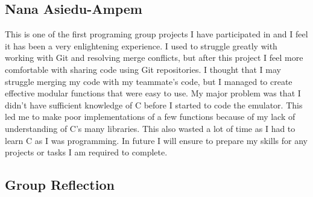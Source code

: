 \documentclass[11pt]{article}
\begin{document}
\subsection{Nana Asiedu-Ampem}
This is one of the first programing group projects I have participated in and I feel it has been a very enlightening experience. I used to struggle greatly with working with Git and resolving merge conflicts, but after this project I feel more comfortable with sharing code using Git repositories. I thought that I may struggle merging my code with my teammate's code, but I managed to create effective modular functions that were easy to use. My major problem was that I didn't have sufficient knowledge of C before I started to code the emulator. This led me to make poor implementations of a few functions because of my lack of understanding of C's many libraries. This also wasted a lot of time as I had to learn C as I was programming. In future I will ensure to prepare my skills for any projects or tasks I am required to complete. \newline
\subsection{Group Reflection}
\end{document}
